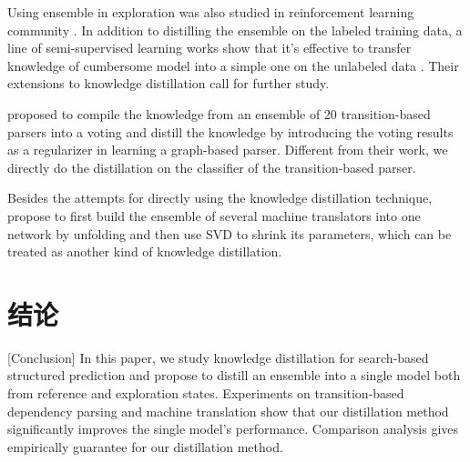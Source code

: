 Using ensemble in exploration was also studied in reinforcement learning
community \cite{NIPS2016_6501}.
In addition to distilling the ensemble on the labeled training data,
a line of semi-supervised learning works show that
it's effective to transfer knowledge of cumbersome model
into a simple one on the unlabeled data \cite{liang:icml08,li-zhang-chen:2014:P14-1}.
Their extensions to knowledge distillation call for further study.

\citet{kuncoro-16} proposed to compile the knowledge from
an ensemble of 20 transition-based parsers
into a voting and distill the knowledge
by introducing the voting results as a regularizer
in learning a graph-based parser.
Different from their work, we directly do the distillation on
the classifier of the transition-based parser.

Besides the attempts for directly using the  knowledge distillation technique,
\citet{stahlberg-byrne:2017:EMNLP2017} propose to first 
build the ensemble of several machine translators into one network by unfolding
and then use SVD to shrink its parameters, which can be treated as another kind of knowledge distillation.

\section{结论}[Conclusion]
In this paper, we study knowledge distillation for search-based structured prediction
and propose to distill an ensemble into a single model both from reference and exploration states.
Experiments on transition-based dependency parsing and machine translation
show that our distillation method significantly improves the single model's performance.
Comparison analysis gives empirically guarantee for our distillation method.
